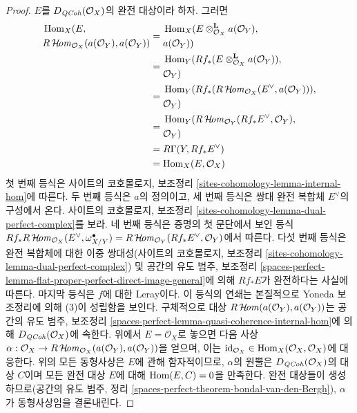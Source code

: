 \begin{proof}
\medskip\noindent
$E$를 $D_{\mathit{QCoh}}(\mathcal{O}_X)$의 완전 대상이라 하자. 그러면
\begin{align*}
\begin{aligned}
&\mathop{\mathrm{Hom}}\nolimits_X(E, \\
&R\mathop{\mathcal{H}\!\mathit{om}}\nolimits_{\mathcal{O}_X}(a(\mathcal{O}_Y), a(\mathcal{O}_Y))
\end{aligned}
& =
\begin{aligned}
&\mathop{\mathrm{Hom}}\nolimits_X(E \otimes_{\mathcal{O}_X}^\mathbf{L} a(\mathcal{O}_Y), \\
&a(\mathcal{O}_Y))
\end{aligned} \\
& =
\begin{aligned}
&\mathop{\mathrm{Hom}}\nolimits_Y(Rf_*(E \otimes_{\mathcal{O}_X}^\mathbf{L} a(\mathcal{O}_Y)), \\
&\mathcal{O}_Y)
\end{aligned} \\
& =
\begin{aligned}
&\mathop{\mathrm{Hom}}\nolimits_Y(Rf_*(R\mathop{\mathcal{H}\!\mathit{om}}\nolimits_{\mathcal{O}_X}(E^\vee, a(\mathcal{O}_Y))), \\
&\mathcal{O}_Y)
\end{aligned} \\
& =
\begin{aligned}
&\mathop{\mathrm{Hom}}\nolimits_Y(R\mathop{\mathcal{H}\!\mathit{om}}\nolimits_{\mathcal{O}_Y}(Rf_*E^\vee, \mathcal{O}_Y), \\
&\mathcal{O}_Y)
\end{aligned} \\
& =
R\Gamma(Y, Rf_*E^\vee) \\
& =
\mathop{\mathrm{Hom}}\nolimits_X(E, \mathcal{O}_X)
\end{align*}
첫 번째 등식은 사이트의 코호몰로지, 보조정리
\ref{sites-cohomology-lemma-internal-hom}에 따른다.
두 번째 등식은 $a$의 정의이고, 세 번째 등식은 쌍대 완전 복합체
$E^\vee$의 구성에서 온다. 사이트의 코호몰로지, 보조정리
\ref{sites-cohomology-lemma-dual-perfect-complex}를 보라.
네 번째 등식은 증명의 첫 문단에서 보인 등식
$Rf_*R\mathop{\mathcal{H}\!\mathit{om}}\nolimits_{\mathcal{O}_X}(E^\vee, \omega_{X/Y}^\bullet) =
R\mathop{\mathcal{H}\!\mathit{om}}\nolimits_{\mathcal{O}_Y}(Rf_*E^\vee, \mathcal{O}_Y)$에서 따른다.
다섯 번째 등식은 완전 복합체에 대한 이중 쌍대성(사이트의 코호몰로지,
보조정리 \ref{sites-cohomology-lemma-dual-perfect-complex}) 및
공간의 유도 범주, 보조정리
\ref{spaces-perfect-lemma-flat-proper-perfect-direct-image-general}에
의해 $Rf_*E$가 완전하다는 사실에 따른다.
마지막 등식은 $f$에 대한 Leray이다.
이 등식의 연쇄는 본질적으로 Yoneda 보조정리에 의해 (3)이 성립함을
보인다. 구체적으로 대상
$R\mathop{\mathcal{H}\!\mathit{om}}\nolimits(a(\mathcal{O}_Y), a(\mathcal{O}_Y))$는 공간의 유도 범주,
보조정리 \ref{spaces-perfect-lemma-quasi-coherence-internal-hom}에
의해 $D_{\mathit{QCoh}}(\mathcal{O}_X)$에 속한다. 위에서
$E = \mathcal{O}_X$로 놓으면 다음 사상
$\alpha : \mathcal{O}_X \to
R\mathop{\mathcal{H}\!\mathit{om}}\nolimits_{\mathcal{O}_X}(a(\mathcal{O}_Y), a(\mathcal{O}_Y))$을 얻으며,
이는
$\text{id}_{\mathcal{O}_X} \in
\mathop{\mathrm{Hom}}\nolimits_X(\mathcal{O}_X, \mathcal{O}_X)$에 대응한다.
위의 모든 동형사상은 $E$에 관해 함자적이므로, $\alpha$의 원뿔은
$D_{\mathit{QCoh}}(\mathcal{O}_X)$의 대상 $C$이며 모든 완전 대상 $E$에 대해
$\mathop{\mathrm{Hom}}\nolimits(E, C) = 0$을 만족한다. 완전 대상들이 생성하므로(공간의 유도 범주,
정리 \ref{spaces-perfect-theorem-bondal-van-den-Bergh}),
$\alpha$가 동형사상임을 결론내린다.
\end{proof}


